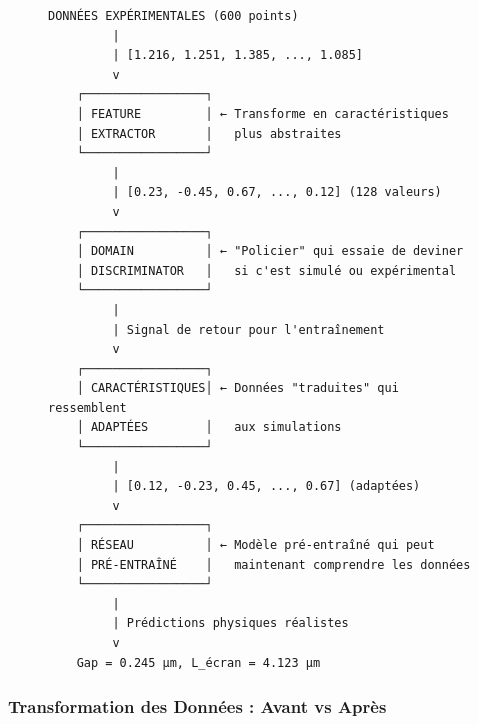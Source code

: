 \documentclass[twocolumn,10pt]{article}
\begin{document}
\begin{figure}[H]
\centering
\begin{lstlisting}[style=matlab, caption=Diagramme ASCII du flux de données]
DONNÉES EXPÉRIMENTALES (600 points)
         |
         | [1.216, 1.251, 1.385, ..., 1.085]
         v
    ┌─────────────────┐
    │ FEATURE         │ ← Transforme en caractéristiques
    │ EXTRACTOR       │   plus abstraites
    └─────────────────┘
         |
         | [0.23, -0.45, 0.67, ..., 0.12] (128 valeurs)
         v
    ┌─────────────────┐
    │ DOMAIN          │ ← "Policier" qui essaie de deviner
    │ DISCRIMINATOR   │   si c'est simulé ou expérimental
    └─────────────────┘
         |
         | Signal de retour pour l'entraînement
         v
    ┌─────────────────┐
    │ CARACTÉRISTIQUES│ ← Données "traduites" qui ressemblent
    │ ADAPTÉES        │   aux simulations
    └─────────────────┘
         |
         | [0.12, -0.23, 0.45, ..., 0.67] (adaptées)
         v
    ┌─────────────────┐
    │ RÉSEAU          │ ← Modèle pré-entraîné qui peut
    │ PRÉ-ENTRAÎNÉ    │   maintenant comprendre les données
    └─────────────────┘
         |
         | Prédictions physiques réalistes
         v
    Gap = 0.245 µm, L_écran = 4.123 µm
\end{lstlisting}
\end{figure}

\subsubsection{Transformation des Données : Avant vs Après}
\end{document}
